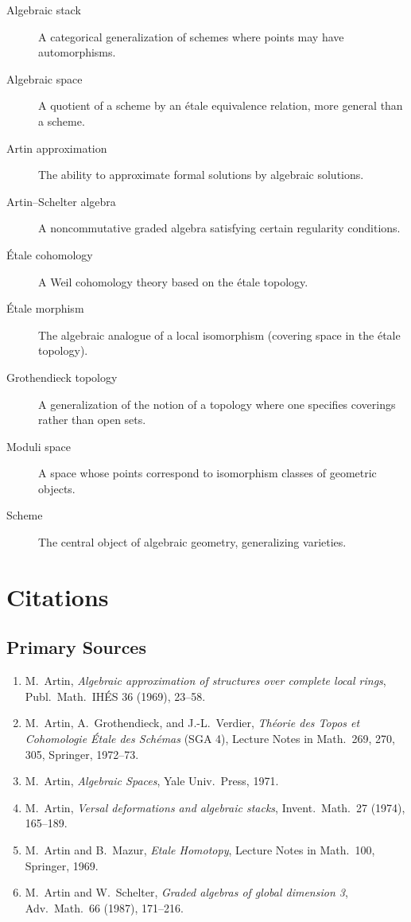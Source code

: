 \begin{description}
    \item[Algebraic stack] A categorical generalization of schemes where points may have automorphisms.
    \item[Algebraic space] A quotient of a scheme by an \'etale equivalence relation, more general than a scheme.
    \item[Artin approximation] The ability to approximate formal solutions by algebraic solutions.
    \item[Artin--Schelter algebra] A noncommutative graded algebra satisfying certain regularity conditions.
    \item[\'Etale cohomology] A Weil cohomology theory based on the \'etale topology.
    \item[\'Etale morphism] The algebraic analogue of a local isomorphism (covering space in the \'etale topology).
    \item[Grothendieck topology] A generalization of the notion of a topology where one specifies coverings rather than open sets.
    \item[Moduli space] A space whose points correspond to isomorphism classes of geometric objects.
    \item[Scheme] The central object of algebraic geometry, generalizing varieties.
\end{description}

\section{Citations}\subsection*{Primary Sources}
\begin{enumerate}
    \item M.\ Artin, \textit{Algebraic approximation of structures over complete local rings}, Publ.\ Math.\ IH\'ES 36 (1969), 23--58.
    \item M.\ Artin, A.\ Grothendieck, and J.-L.\ Verdier, \textit{Th\'eorie des Topos et Cohomologie \'Etale des Sch\'emas} (SGA 4), Lecture Notes in Math.\ 269, 270, 305, Springer, 1972--73.
    \item M.\ Artin, \textit{Algebraic Spaces}, Yale Univ.\ Press, 1971.
    \item M.\ Artin, \textit{Versal deformations and algebraic stacks}, Invent.\ Math.\ 27 (1974), 165--189.
    \item M.\ Artin and B.\ Mazur, \textit{Etale Homotopy}, Lecture Notes in Math.\ 100, Springer, 1969.
    \item M.\ Artin and W.\ Schelter, \textit{Graded algebras of global dimension 3}, Adv.\ Math.\ 66 (1987), 171--216.
\end{enumerate}

